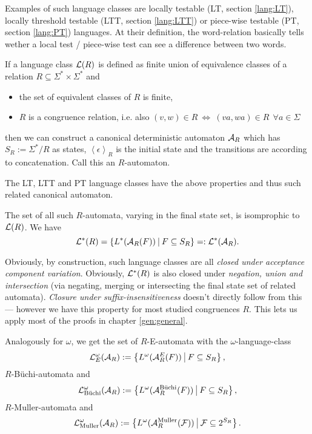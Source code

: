 Examples of such language classes are locally testable (LT, section \ref{lang:LT}), locally threshold testable (LTT, section \ref{lang:LTT}) or piece-wise testable (PT, section \ref{lang:PT}) languages. At their definition, the word-relation basically tells wether a local test / piece-wise test can see a difference between two words.

If a language class $\mathcal{L}(R)$ is defined as finite union of equivalence classes of a relation $R \subseteq \Sigma^* \times \Sigma^*$ and
\begin{itemize}
\item the set of equivalent classes of $R$ is finite,
\item $R$ is a congruence relation, i.e. also $(v,w) \in R \ \Leftrightarrow \ (va,wa) \in R \ \ \forall a \in \Sigma$
\end{itemize}
then we can construct a canonical deterministic automaton $\mathcal{A}_R$ which has $S_R := \Sigma^* / R$ as states, $\left<\epsilon\right>_R$ is the initial state and the transitions are according to concatenation. Call this an $R$-automaton.

The LT, LTT and PT language classes have the above properties and thus such related canonical automaton.

The set of all such $R$-automata, varying in the final state set, is isomprophic to $\mathcal{L}(R)$. We have
\[ \Lang^*(R) = \Set{L^*(\A_R(F))}{F \subseteq S_R} =: \Lang^*(\A_R) . \]

Obviously, by construction, such language classes are all \emph{closed under acceptance component variation}. Obviously, $\mathcal{L}^*(R)$ is also closed under \emph{negation, union and intersection} (via negating, merging or intersecting the final state set of related automata). \emph{Closure under suffix-insensitiveness} doesn't directly follow from this --- however we have this property for most studied congruences $R$. This lets us apply most of the proofs in chapter \ref{gen:general}.

\begin{mydef}
Analogously for $\omega$, we get the set of $R$-E-automata with the $\omega$-language-class
\[ \Lang^\omega_E(\A_R) := \Set{L^\omega(\A^E_R(F))}{F \subseteq S_R} , \]
$R$-Büchi-automata and
\[ \Lang^\omega_{\text{Büchi}} (\A_R) := \Set{L^\omega(\A_R^{\text{Büchi}}(F))}{F \subseteq S_R} , \]
$R$-Muller-automata and
\[ \Lang^\omega_{\text{Muller}} (\A_R) := \Set{L^\omega(\A_R^{\text{Muller}}(\F))}{\F \subseteq 2^{S_R}} . \]
\end{mydef}

